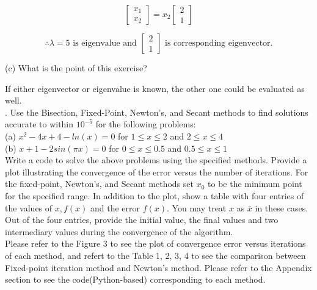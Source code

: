 \documentclass{article} %
\begin{document}
{    \[
        \begin{bmatrix}
        x_1 \\
        x_2 
        \end{bmatrix}
        =
        x_2
        \begin{bmatrix}
        2 \\
        1 
        \end{bmatrix}
    \]

    \[
        \therefore \lambda = 5 \text{ is eigenvalue and } 
        \begin{bmatrix}
            2 \\
            1
        \end{bmatrix} \text{ is corresponding eigenvector.}
    \]

    \noindent (c) What is the point of this exercise?

    If either eigenvector or eigenvalue is known, the other one could be evaluated as well.\\

    . Use the Bisection, Fixed-Point, Newton’s, and Secant methods to find solutions accurate to within 
    $ 10^{-5} $ for the following problems: \\
    (a) $ x^2 - 4x + 4 - ln(x) = 0 $ for $ 1 \leq x \leq 2 $ and $ 2 \leq x \leq 4 $ \\
    (b) $ x + 1 - 2sin(\pi x) = 0 $ for $ 0 \leq x \leq 0.5 $ and $ 0.5 \leq x \leq 1 $ \\
    Write a code to solve the above problems using the specified methods. Provide a plot illustrating the
    convergence of the error versus the number of iterations. For the fixed-point, Newton’s, and Secant
    methods set $ x_0 $ to be the minimum point for the specified range. In addition to the plot, show a table
    with four entries of the values of $ x, f(x) $ and the error $ f(x) $. You may treat $ x $ as $ \bar{x} $ in these cases. Out
    of the four entries, provide the initial value, the final values and two intermediary values during the
    convergence of the algorithm. \\

    Please refer to the Figure 3 to see the plot of convergence error versus iterations of each method, 
    and refert to the Table 1, 2, 3, 4 to see the comparison between Fixed-point iteration method and Newton's method.
    Please refer to the Appendix section to see the code(Python-based) corresponding to each method. \\

}
\end{document}
